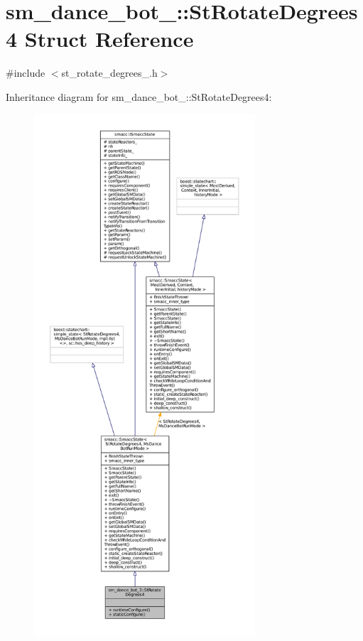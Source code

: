 \hypertarget{structsm__dance__bot__3_1_1StRotateDegrees4}{}\section{sm\+\_\+dance\+\_\+bot\+\_\+:\+:St\+Rotate\+Degrees4 Struct Reference}
\label{structsm__dance__bot__3_1_1StRotateDegrees4}


{\ttfamily \#include $<$st\+\_\+rotate\+\_\+degrees\+\_.\+h$>$}



Inheritance diagram for sm\+\_\+dance\+\_\+bot\+\_\+:\+:St\+Rotate\+Degrees4\+:
\nopagebreak
\begin{figure}[H]
\begin{center}
\leavevmode
\includegraphics[height=550pt]{structsm__dance__bot__3_1_1StRotateDegrees4__inherit__graph}
\end{center}
\end{figure}


